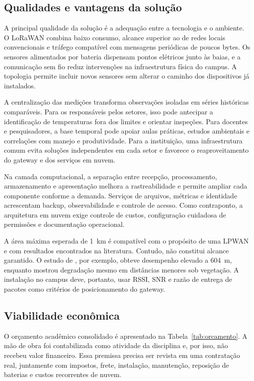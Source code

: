\documentclass[10pt,a4paper,twocolumn]{article}
\begin{document}
\subsection{Qualidades e vantagens da solução}

A principal qualidade da solução é a adequação entre a tecnologia e o ambiente.
O LoRaWAN combina baixo consumo, alcance superior ao de redes locais
convencionais e tráfego compatível com mensagens periódicas de poucos bytes. Os
sensores alimentados por bateria dispensam pontos elétricos junto às baias, e a
comunicação sem fio reduz intervenções na infraestrutura física do campus. A
topologia permite incluir novos sensores sem alterar o caminho dos dispositivos
já instalados.

A centralização das medições transforma observações isoladas em séries
históricas comparáveis. Para os responsáveis pelos setores, isso pode antecipar
a identificação de temperaturas fora dos limites e orientar inspeções. Para
docentes e pesquisadores, a base temporal pode apoiar aulas práticas, estudos
ambientais e correlações com manejo e produtividade. Para a instituição, uma
infraestrutura comum evita soluções independentes em cada setor e favorece o
reaproveitamento do gateway e dos serviços em nuvem.

Na camada computacional, a separação entre recepção, processamento,
armazenamento e apresentação melhora a rastreabilidade e permite ampliar cada
componente conforme a demanda. Serviços de arquivos, métricas e identidade
acrescentam backup, observabilidade e controle de acesso. Como contraponto, a
arquitetura em nuvem exige controle de custos, configuração cuidadosa de
permissões e documentação operacional.

A área máxima esperada de \SI{1}{\kilo\meter} é compatível com o propósito de uma
LPWAN e com resultados encontrados na literatura. Contudo, não constitui alcance
garantido. O estudo de , por exemplo, obteve desempenho
elevado a \SI{604}{\meter}, enquanto  mostrou degradação
mesmo em distâncias menores sob vegetação. A instalação no campus deve, portanto,
usar RSSI, SNR e razão de entrega de pacotes como critérios de posicionamento do
gateway.

\subsection{Viabilidade econômica}

O orçamento acadêmico consolidado é apresentado na Tabela~\ref{tab:orcamento}.
A mão de obra foi contabilizada como atividade da disciplina e, por isso, não
recebeu valor financeiro. Essa premissa precisa ser revista em uma contratação
real, juntamente com impostos, frete, instalação, manutenção, reposição de
baterias e custos recorrentes de nuvem.
\end{document}
